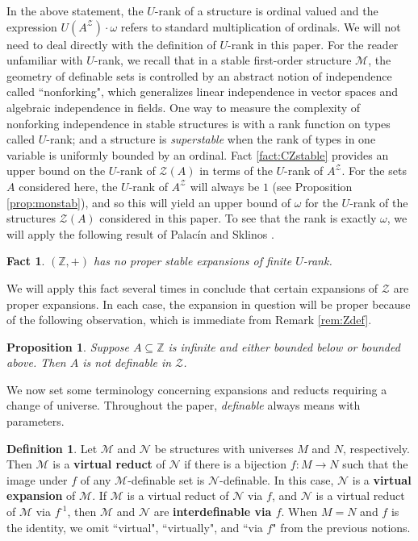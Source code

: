 \documentclass{amsart}
\def\seq{\subseteq}
\def\inv{^{\text{-}1}}
\newcommand{\cM}{\mathcal{M}}
\newcommand{\cN}{\mathcal{N}}
\newcommand{\cZ}{\mathcal{Z}}
\def\Z{\mathbb Z}
\newtheorem{proposition}[theorem]{Proposition}
\newtheorem{fact}[theorem]{Fact}
\theoremstyle{definition}
\newtheorem{definition}[theorem]{Definition}
\begin{document}
In the above statement, the $U$-rank of a structure is ordinal valued and the expression $U(A^{\cZ})\cdot\omega$ refers to standard multiplication of ordinals. We will not need to deal directly with the definition of $U$-rank in this paper. For the reader unfamiliar with $U$-rank, we recall that in a stable first-order structure $\cM$, the geometry of definable sets is controlled by an abstract notion of independence called ``nonforking", which generalizes linear independence in vector spaces and algebraic independence in fields. One way to measure the complexity of nonforking independence in stable structures is with a rank function on types called $U$-rank; and a structure is \emph{superstable} when the rank of types in one variable is uniformly bounded by an ordinal. 
Fact \ref{fact:CZstable} provides an upper bound on the $U$-rank of $\cZ(A)$ in terms of the $U$-rank of $A^{\cZ}$. For the sets $A$ considered here, the $U$-rank of $A^{\cZ}$ will always be $1$ (see Proposition \ref{prop:monstab}), and so this will yield an upper bound of $\omega$ for the $U$-rank of the structures $\cZ(A)$ considered in this paper. To see that the rank is exactly $\omega$, we will apply the following result of Palac\'{i}n and Sklinos \cite{PaSk}. 

\begin{fact}\label{fact:PSexp}
$(\Z,+)$ has no proper stable expansions of finite $U$-rank.
\end{fact}

We will apply this fact several times in conclude that certain expansions of $\cZ$ are proper expansions. In each case, the expansion in question will be proper because of the following observation, which is immediate from Remark \ref{rem:Zdef}. 

\begin{proposition}
Suppose $A\seq\Z$ is infinite and either bounded below or bounded above. Then $A$ is not definable in $\cZ$.
\end{proposition}



We now set some terminology concerning expansions and reducts requiring a change of universe. Throughout the paper, \emph{definable} always means with parameters.

\begin{definition}
Let $\cM$ and $\cN$ be structures with universes $M$ and $N$, respectively. Then $\cM$ is a \textbf{virtual reduct} of $\cN$ if there is a bijection $f\colon M\to N$ such that the image under $f$ of any $\cM$-definable set is $\cN$-definable. In this case, $\cN$ is a \textbf{virtual expansion} of $\cM$. If $\cM$ is a virtual reduct of $\cN$ via $f$, and $\cN$ is a virtual reduct of $\cM$ via $f\inv$, then $\cM$ and $\cN$ are \textbf{interdefinable via $f$}. When $M=N$ and $f$ is the identity, we omit ``virtual", ``virtually", and ``via $f$" from the previous notions. 
\end{definition}
\end{document}
